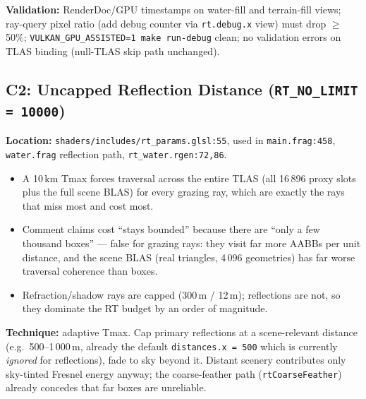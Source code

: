 \documentclass[11pt,a4paper]{article}
\begin{document}
\begin{tcolorbox}[promptbox={Prompt: Gate, Downsample, and Upsample Solid/Water Inline Rays}]
\textbf{Validation:} RenderDoc/GPU timestamps on water-fill and terrain-fill views; ray-query pixel ratio (add debug counter via \texttt{rt.debug.x} view) must drop $\geq$50\%; \texttt{VULKAN\_GPU\_ASSISTED=1 make run-debug} clean; no validation errors on TLAS binding (null-TLAS skip path unchanged).
\end{tcolorbox}

\subsection{C2: Uncapped Reflection Distance (\texttt{RT\_NO\_LIMIT = 10000})}

\textbf{Location:} \texttt{shaders/includes/rt\_params.glsl:55}, used in \texttt{main.frag:458}, \texttt{water.frag} reflection path, \texttt{rt\_water.rgen:72,86}.

\begin{itemize}
    \item A 10\,km Tmax forces traversal across the entire TLAS (all 16\,896 proxy slots plus the full scene BLAS) for every grazing ray, which are exactly the rays that miss most and cost most.
    \item Comment claims cost ``stays bounded'' because there are ``only a few thousand boxes'' --- false for grazing rays: they visit far more AABBs per unit distance, and the scene BLAS (real triangles, 4\,096 geometries) has far worse traversal coherence than boxes.
    \item Refraction/shadow rays are capped (300\,m / 12\,m); reflections are not, so they dominate the RT budget by an order of magnitude.
\end{itemize}

\textbf{Technique:} adaptive Tmax. Cap primary reflections at a scene-relevant distance (e.g.\ 500--1\,000\,m, already the default \texttt{distances.x = 500} which is currently \textit{ignored} for reflections), fade to sky beyond it. Distant scenery contributes only sky-tinted Fresnel energy anyway; the coarse-feather path (\texttt{rtCoarseFeather}) already concedes that far boxes are unreliable.
\end{document}
